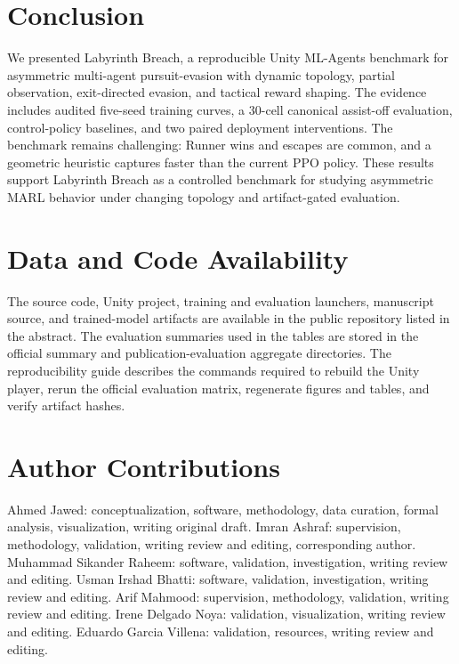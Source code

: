 \documentclass[journal]{IEEEtran}
\begin{document}
\section{Conclusion}

We presented Labyrinth Breach, a reproducible Unity ML-Agents benchmark for asymmetric multi-agent pursuit-evasion with dynamic topology, partial observation, exit-directed evasion, and tactical reward shaping. The evidence includes audited five-seed training curves, a 30-cell canonical assist-off evaluation, control-policy baselines, and two paired deployment interventions. The benchmark remains challenging: Runner wins and escapes are common, and a geometric heuristic captures faster than the current PPO policy. These results support Labyrinth Breach as a controlled benchmark for studying asymmetric MARL behavior under changing topology and artifact-gated evaluation.

\section*{Data and Code Availability}

The source code, Unity project, training and evaluation launchers, manuscript
source, and trained-model artifacts are available in the public repository
listed in the abstract. The evaluation summaries used in the tables are stored
in the official summary and publication-evaluation aggregate directories. The
reproducibility guide describes the commands required to rebuild the Unity
player, rerun the official evaluation matrix, regenerate figures and tables,
and verify artifact hashes.

\section*{Author Contributions}

Ahmed Jawed: conceptualization, software, methodology, data curation, formal
analysis, visualization, writing original draft. Imran Ashraf: supervision,
methodology, validation, writing review and editing, corresponding author.
Muhammad Sikander Raheem: software, validation, investigation, writing review
and editing. Usman Irshad Bhatti: software, validation, investigation, writing
review and editing. Arif Mahmood: supervision, methodology, validation, writing
review and editing. Irene Delgado Noya: validation, visualization, writing
review and editing. Eduardo Garcia Villena: validation, resources, writing
review and editing.
\end{document}

